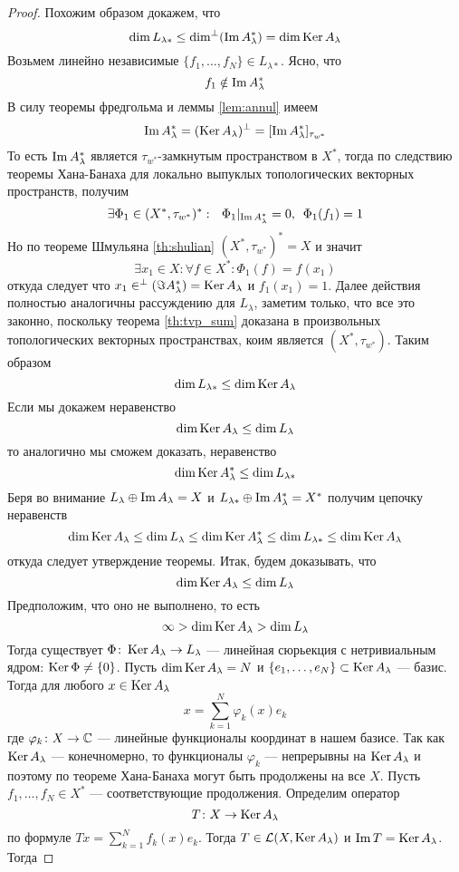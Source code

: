 \begin{proof}
	Похожим образом докажем, что 
	$$
	\dim L_{\lambda *} \leq \dim ^\perp (\operatorname{Im} A_\lambda^*) = \dim \operatorname{Ker} A_\lambda
	$$ Возьмем линейно независимые $\{f_1, \dots, f_N\} \in L_{\lambda *}$. Ясно, что 
	$$
	f_1 \notin \operatorname{Im} A_\lambda^* 
	$$
	В силу теоремы фредгольма и леммы \ref{lem:annul} имеем
	$$
	\operatorname{Im} A_\lambda^* = (\operatorname{Ker} A_\lambda)^\perp = [\operatorname{Im} A_\lambda^*]_{\tau_{w^*}}
	$$
	То есть $\operatorname{Im} A_\lambda^*$ является $\tau_{w^*}$-замкнутым пространством в $X^*$, тогда по следствию теоремы Хана-Банаха для локально выпуклых топологических векторных пространств, получим 
	$$
	\exists \Phi_1 \in (X^*, \tau_{w^*})^*: \ \ \Phi_1\Large |_{\Ima A_\lambda^*} =0, \ \Phi_1(f_1) = 1
	$$
	Но по теореме Шмульяна \ref{th:shulian} $(X^*, \tau_{w^*})^* = X$ и значит $$\exists x_1 \in X: \forall f \in X^*: \Phi_1(f) = f(x_1)$$
	откуда следует что $x_1 \in ^\perp (\Im A_\lambda^*) = \operatorname{Ker} A_\lambda$ и $f_1(x_1) = 1$. Далее действия полностью аналогичны рассуждению для $L_{\lambda}$, заметим только, что все это законно, поскольку теорема \ref{th:tvp_sum} доказана в произвольных топологических векторных пространствах, коим является $(X^*, \tau_{w^*})$. Таким образом 
	$$
	\dim L_{\lambda *} \leq \dim \operatorname{Ker} A_\lambda
	$$
	Если мы докажем неравенство 
	$$
	\dim \operatorname{Ker} A_\lambda \leq \dim L_\lambda
	$$
	то аналогично мы сможем доказать, неравенство 
	$$
	\dim \operatorname{Ker} A_\lambda^* \leq \dim L_{\lambda *}
	$$
	Беря во внимание $L_\lambda \oplus \operatorname{Im} A_\lambda = X$ и $L_{\lambda *} \oplus \operatorname{Im} A_\lambda^* = X^*$ получим цепочку неравенств 
	$$
	\dim \operatorname{Ker} A_\lambda \leq \dim L_\lambda \leq \dim \operatorname{Ker} A_\lambda^* \leq \dim L_{\lambda *} \leq \dim \operatorname{Ker} A_\lambda	
	$$
	откуда следует утверждение теоремы. 
	Итак, будем доказывать, что 
	$$
	\dim \operatorname{Ker} A_\lambda \leq \dim L_\lambda
	$$
	Предположим, что оно не выполнено, то есть 
	$$
	 \infty > \dim \operatorname{Ker} A_\lambda > \dim L_\lambda
	$$
	Тогда существует $\Phi \colon \operatorname{Ker} A_\lambda \to L_\lambda$ --- линейная сюрьекция с нетривиальным ядром: $\operatorname{Ker} \Phi \neq \{0\}$. Пусть $\dim \operatorname{Ker} A_\lambda = N$ и $\{e_1, \dots, e_N\} \subset \operatorname{Ker} A_\lambda$ --- базис. Тогда для любого $x \in \operatorname{Ker} A_\lambda$
	$$
	x = \sum_{k=1}^N \varphi_k(x) e_k
	$$
	где $\varphi_k \colon X \to \mathbb{C}$ --- линейные функционалы координат в нашем базисе. Так как $\operatorname{Ker} A_\lambda$ --- конечномерно, то функционалы $\varphi_k$ --- непрерывны на $\operatorname{Ker} A_\lambda$ и поэтому по теореме Хана-Банаха могут быть продолжены на все $X$. Пусть $f_1, \dots, f_N \in X^*$ --- соответствующие продолжения. Определим оператор 
	$$
	T \colon X \to \operatorname{Ker} A_\lambda
	$$
	по формуле $Tx = \sum_{k=1}^N f_k(x) e_k$. Тогда $T \in \mathcal{L}(X, \operatorname{Ker} A_\lambda)$ и $\operatorname{Im} T = \operatorname{Ker} A_\lambda$. Тогда 

\end{proof}
